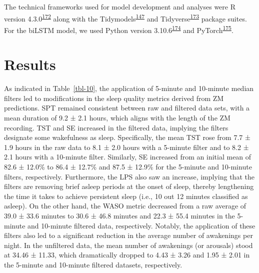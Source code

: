 \documentclass[
  10pt,
]{scrbook}
\begin{document}
The technical frameworks used for model development and analyses were R
version
4.3.0\textsuperscript{\protect\hyperlink{ref-rcoreteam_2023}{172}} along
with the
Tidymodels\textsuperscript{\protect\hyperlink{ref-kuhn_tidymodels_2020}{147}}
and
Tidyverse\textsuperscript{\protect\hyperlink{ref-wickham_tidyverse_2019}{173}}
package suites. For the biLSTM model, we used Python version
3.10.6\textsuperscript{\protect\hyperlink{ref-vanrossum_python_2009}{174}}
and
PyTorch\textsuperscript{\protect\hyperlink{ref-paszke_pytorch_2019}{175}}.

\hypertarget{results-2}{%
\section{Results}\label{results-2}}

As indicated in Table~\ref{tbl-10}, the application of 5-minute and
10-minute median filters led to modifications in the sleep quality
metrics derived from ZM predictions. SPT remained consistent between raw
and filtered data sets, with a mean duration of 9.2 ± 2.1 hours, which
aligns with the length of the ZM recording. TST and SE increased in the
filtered data, implying the filters designate some wakefulness as sleep.
Specifically, the mean TST rose from 7.7 ± 1.9 hours in the raw data to
8.1 ± 2.0 hours with a 5-minute filter and to 8.2 ± 2.1 hours with a
10-minute filter. Similarly, SE increased from an initial mean of 82.6 ±
12.0\% to 86.4 ± 12.7\% and 87.5 ± 12.9\% for the 5-minute and 10-minute
filters, respectively. Furthermore, the LPS also saw an increase,
implying that the filters are removing brief asleep periods at the onset
of sleep, thereby lengthening the time it takes to achieve persistent
sleep (i.e., 10 out 12 minutes classified as asleep). On the other hand,
the WASO metric decreased from a raw average of 39.0 ± 33.6 minutes to
30.6 ± 46.8 minutes and 22.3 ± 55.4 minutes in the 5-minute and
10-minute filtered data, respectively. Notably, the application of these
filters also led to a significant reduction in the average number of
awakenings per night. In the unfiltered data, the mean number of
awakenings (or arousals) stood at 34.46 ± 11.33, which dramatically
dropped to 4.43 ± 3.26 and 1.95 ± 2.01 in the 5-minute and 10-minute
filtered datasets, respectively.

\begingroup

\footnotesize
\end{document}
